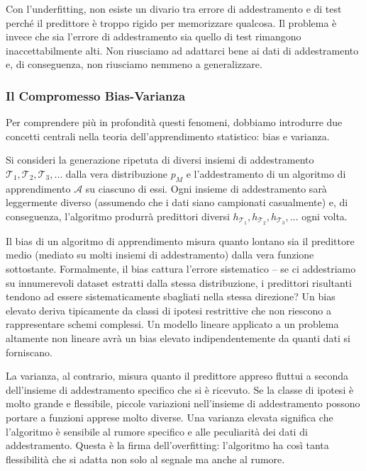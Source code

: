 Con l'underfitting, non esiste un divario tra errore di addestramento e di test perché il predittore è troppo rigido per memorizzare qualcosa. Il problema è invece che sia l'errore di addestramento sia quello di test rimangono inaccettabilmente alti. Non riusciamo ad adattarci bene ai dati di addestramento e, di conseguenza, non riusciamo nemmeno a generalizzare.

\subsubsection*{Il Compromesso Bias-Varianza}

Per comprendere più in profondità questi fenomeni, dobbiamo introdurre due concetti centrali nella teoria dell'apprendimento statistico: \alert{bias} e \alert{varianza}.

Si consideri la generazione ripetuta di diversi insiemi di addestramento $\mathcal{T}_1, \mathcal{T}_2, \mathcal{T}_3, \ldots$ dalla vera distribuzione $p_M$ e l'addestramento di un algoritmo di apprendimento $\mathcal{A}$ su ciascuno di essi. Ogni insieme di addestramento sarà leggermente diverso (assumendo che i dati siano campionati casualmente) e, di conseguenza, l'algoritmo produrrà predittori diversi $h_{\mathcal{T}_1}, h_{\mathcal{T}_2}, h_{\mathcal{T}_3}, \ldots$ ogni volta.

Il \alert{bias} di un algoritmo di apprendimento misura quanto lontano sia il predittore medio (mediato su molti insiemi di addestramento) dalla vera funzione sottostante. Formalmente, il bias cattura l'errore sistematico -- se ci addestriamo su innumerevoli dataset estratti dalla stessa distribuzione, i predittori risultanti tendono ad essere sistematicamente sbagliati nella stessa direzione? Un bias elevato deriva tipicamente da classi di ipotesi restrittive che non riescono a rappresentare schemi complessi. Un modello lineare applicato a un problema altamente non lineare avrà un bias elevato indipendentemente da quanti dati si forniscano.

La \alert{varianza}, al contrario, misura quanto il predittore appreso fluttui a seconda dell'insieme di addestramento specifico che si è ricevuto. Se la classe di ipotesi è molto grande e flessibile, piccole variazioni nell'insieme di addestramento possono portare a funzioni apprese molto diverse. Una varianza elevata significa che l'algoritmo è sensibile al rumore specifico e alle peculiarità dei dati di addestramento. Questa è la firma dell'overfitting: l'algoritmo ha così tanta flessibilità che si adatta non solo al segnale ma anche al rumore.

